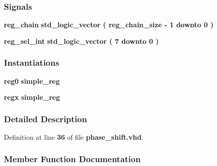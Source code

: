 \subsubsection*{Signals}
 \begin{DoxyCompactItemize}
\item 
{\bf reg\+\_\+chain} {\bfseries \textcolor{comment}{std\+\_\+logic\+\_\+vector}\textcolor{vhdlchar}{ }\textcolor{vhdlchar}{(}\textcolor{vhdlchar}{ }\textcolor{vhdlchar}{ }\textcolor{vhdlchar}{ }\textcolor{vhdlchar}{ }{\bfseries {\bf reg\+\_\+chain\+\_\+size}} \textcolor{vhdlchar}{-\/}\textcolor{vhdlchar}{ } \textcolor{vhdldigit}{1} \textcolor{vhdlchar}{ }\textcolor{keywordflow}{downto}\textcolor{vhdlchar}{ }\textcolor{vhdlchar}{ } \textcolor{vhdldigit}{0} \textcolor{vhdlchar}{ }\textcolor{vhdlchar}{)}\textcolor{vhdlchar}{ }} 
\item 
{\bf reg\+\_\+sel\+\_\+int} {\bfseries \textcolor{comment}{std\+\_\+logic\+\_\+vector}\textcolor{vhdlchar}{ }\textcolor{vhdlchar}{(}\textcolor{vhdlchar}{ }\textcolor{vhdlchar}{ } \textcolor{vhdldigit}{7} \textcolor{vhdlchar}{ }\textcolor{keywordflow}{downto}\textcolor{vhdlchar}{ }\textcolor{vhdlchar}{ } \textcolor{vhdldigit}{0} \textcolor{vhdlchar}{ }\textcolor{vhdlchar}{)}\textcolor{vhdlchar}{ }} 
\end{DoxyCompactItemize}
\subsubsection*{Instantiations}
 \begin{DoxyCompactItemize}
\item 
{\bf reg0}  {\bfseries simple\+\_\+reg}   
\item 
{\bf regx}  {\bfseries simple\+\_\+reg}   
\end{DoxyCompactItemize}


\subsubsection{Detailed Description}


Definition at line {\bf 36} of file {\bf phase\+\_\+shift.\+vhd}.



\subsubsection{Member Function Documentation}
